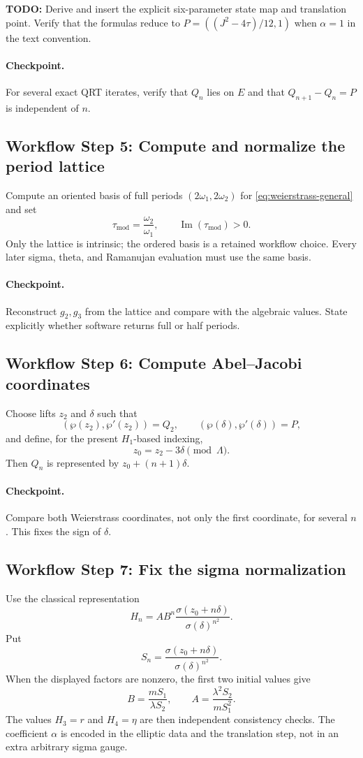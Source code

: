 \documentclass[11pt]{article}
\newcommand{\workflowstep}[1]{\subsection{Workflow Step #1}}
\newcommand{\taupar}{\tau}
\newcommand{\taumod}{\tau_{\mathrm{mod}}}
\newcommand{\TODO}[1]{\par\noindent\textcolor{red!70!black}{\textbf{TODO:} #1}\par}
\begin{document}
\TODO{Derive and insert the explicit six-parameter state map and translation
point.  Verify that the formulas reduce to
$P=((J^2-4\taupar)/12,1)$ when $\alpha=1$ in the text convention.}

\paragraph{Checkpoint.}
For several exact QRT iterates, verify that $Q_n$ lies on $E$ and that
$Q_{n+1}-Q_n=P$ is independent of $n$.

\workflowstep{5: Compute and normalize the period lattice}
Compute an oriented basis of full periods $(2\omega_1,2\omega_2)$ for
\cref{eq:weierstrass-general} and set
\begin{equation}
 \taumod=\frac{\omega_2}{\omega_1},\qquad
 \operatorname{Im}(\taumod)>0.
 \label{eq:tau-mod}
\end{equation}
Only the lattice is intrinsic; the ordered basis is a retained workflow
choice.  Every later sigma, theta, and Ramanujan evaluation must use the same
basis.

\paragraph{Checkpoint.}
Reconstruct $g_2,g_3$ from the lattice and compare with the algebraic values.
State explicitly whether software returns full or half periods.

\workflowstep{6: Compute Abel--Jacobi coordinates}
Choose lifts $z_2$ and $\delta$ such that
\[
 (\wp(z_2),\wp'(z_2))=Q_2,
 \qquad
 (\wp(\delta),\wp'(\delta))=P,
\]
and define, for the present $H_1$-based indexing,
\begin{equation}
 z_0=z_2-3\delta\pmod\Lambda.
 \label{eq:z0}
\end{equation}
Then $Q_n$ is represented by $z_0+(n+1)\delta$.

\paragraph{Checkpoint.}
Compare both Weierstrass coordinates, not only the first coordinate, for
several $n$.  This fixes the sign of $\delta$.

\workflowstep{7: Fix the sigma normalization}
Use the classical representation
\begin{equation}
 H_n=A B^n
 \frac{\sigma(z_0+n\delta)}{\sigma(\delta)^{n^2}}.
 \label{eq:sigma}
\end{equation}
Put
\[
 S_n=\frac{\sigma(z_0+n\delta)}{\sigma(\delta)^{n^2}}.
\]
When the displayed factors are nonzero, the first two initial values give
\begin{equation}
 B=\frac{mS_1}{\lambda S_2},\qquad
 A=\frac{\lambda^2S_2}{mS_1^2}.
 \label{eq:AB}
\end{equation}
The values $H_3=r$ and $H_4=\eta$ are then independent consistency checks.
The coefficient $\alpha$ is encoded in the elliptic data and the translation
step, not in an extra arbitrary sigma gauge.
\end{document}
